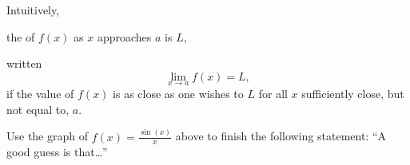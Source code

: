 \documentclass{ximera}
\begin{document}
\begin{definition}
  Intuitively,
  \begin{center}
    the  of $f(x)$ as $x$ approaches $a$ is $L$,
  \end{center}
  written
  \[
  \lim_{x\to a} f(x) = L,
  \]
  if the value of $f(x)$ is as close as one wishes to $L$ for
  all $x$ sufficiently close, but not equal to, $a$.
\end{definition}

\begin{question}
  Use the graph of $f(x) = \frac{\sin(x)}{x}$ above to finish the following statement: ``A good guess is that\dots''
  \begin{multipleChoice}
  \end{multipleChoice}
\end{question}
\end{document}

